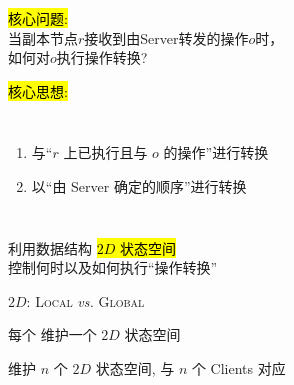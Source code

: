 \begin{frame}{}
  \begin{center}
    \hl{核心问题:} \\[8pt]
    当副本节点$r$接收到由Server转发的操作$o$时，\\
    如何对$o$执行操作转换?
  
    \pause
    \vspace{0.80cm}

    \pause
    \vspace{0.80cm}

    \hl{核心思想:} \\[3pt]
    \begin{columns}
	\begin{enumerate}
	  \item 与``$r$ 上已执行且与 $o$ 的操作''进行转换
	  \item 以``由 Server 确定的顺序''进行转换 
	\end{enumerate}
    \end{columns}
  \end{center}
\end{frame}

\begin{frame}{}
  \begin{center}
    {\large 利用数据结构 \hl{$2D$ 状态空间}~ \\
    控制何时以及如何执行``操作转换''}
  \end{center}


  \begin{center}
    $2D$: {\textsc{Local}} \emph{vs.} \textsc{Global}
  \end{center}
\end{frame}

\begin{frame}{}
  \centerline{\large 每个  维护一个 $2D$ 状态空间}


  \centerline{\large {} 维护 $n$ 个 $2D$ 状态空间, 与 $n$ 个 Clients 对应}
\end{frame}

